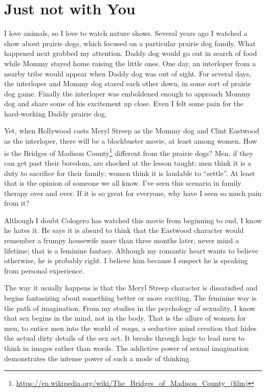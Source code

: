 \section{Just not with You}

I love animals, so I love to watch nature shows. Several years ago I watched a show about prairie dogs, which focused on a particular prairie dog family. What happened next grabbed my attention. Daddy dog would go out in search of food while Mommy stayed home raising the little ones. One day, an interloper from a nearby tribe would appear when Daddy dog was out of sight. For several days, the interloper and Mommy dog stared each other down, in some sort of prairie dog game. Finally the interloper was emboldened enough to approach Mommy dog and share some of his excitement up close. Even I felt some pain for the hard-working Daddy prairie dog.

Yet, when Hollywood casts Meryl Streep as the Mommy dog and Clint Eastwood as the interloper, there will be a blockbuster movie, at least among women. How is the Bridges of Madison County\footnote{\url{https://en.wikipedia.org/wiki/The\_Bridges\_of\_Madison\_County\_(film)}} different from the prairie dogs? Men, if they can get past their boredom, are shocked at the lesson taught: men think it is a duty to sacrifice for their family; women think it is laudable to ``settle''. At least that is the opinion of someone we all know. I've seen this scenario in family therapy over and over. If it is so great for everyone, why have I seen so much pain from it?

Although I doubt Cologero has watched this movie from beginning to end, I know he hates it. He says it is absurd to think that the Eastwood character would remember a frumpy housewife more than three months later, never mind a lifetime; that is a feminine fantasy. Although my romantic heart wants to believe otherwise, he is probably right. I believe him because I suspect he is speaking from personal experience.

The way it usually happens is that the Meryl Streep character is dissatisfied and begins fantasizing about something better or more exciting. The feminine way is the path of imagination. From my studies in the psychology of sexuality, I know that sex begins in the mind, not in the body. That is the allure of women for men, to entice men into the world of \emph{maya}, a seductive mind creation that hides the actual dirty details of the sex act. It breaks through logic to lead men to think in images rather than words. The addictive power of sexual imagination demonstrates the intense power of such a mode of thinking.

